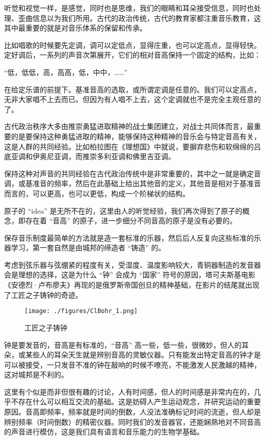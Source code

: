 听觉和视觉一样，是感觉，同时也是思维，我们的眼睛和耳朵接受信息，同时也处理、歪曲信息以为我们所用。古代的政治传统，古代的教育家都注重音乐教育，这其中最重要的就是对音乐体系的保留和传承。

比如唱歌的时候要先定调，调可以定低点，显得庄重，也可以定高点，显得轻快。定好调后，一系列的声音次第展开，它们的相对音高保持一个固定的结构，比如：

“低，低低，高，高高，低，中中，……”

在给定乐谱的前提下。基准音高的选取，或所谓定调是任意的。我们可以定高点，无非大家唱不上去而已。但因为有人唱不上去，这个定调就也不是完全主观任意的了。

古代政治秩序大多由推崇勇猛进取精神的战士集团建立，对战士共同体而言，最重要的是要保持这种勇猛进取的精神，能够保持这种精神的音乐会与特定音高有关，这是人群的共同经验。比如柏拉图在《理想国》中就说，要摒弃悲伤和软绵绵的吕底亚调和伊奥尼亚调，而推崇多利亚调和佛里吉亚调。

保持这种对声音的共同经验在古代政治传统中是非常重要的，其中之一就是确定音调，或基准音的频率，然后在此基础上给出其他音的定义，其他音是相对于基准音而言的，可以更高，也可以更低，构成一个阶梯状的结构。

原子的 “idea” 是无所不在的，这里由人的听觉经验，我们再次得到了原子的概念，即存在着 “音高” 的原子，进一步细分不同音高的原子是没有必要的。

保存音乐制度最简单的方法就是造一套标准的乐器，然后后人反复向这些标准的乐器学习，第一套自然是由城邦的缔造者 “铸造” 的。

考虑到弦乐器与弦绷紧的程度有关，受湿度、温度影响较大，青铜器制造的发音器会是理想的选择，这是为什么 “钟” 会成为 “国家” 符号的原因，塔可夫斯基电影《安德烈·卢布廖夫》再现的是俄罗斯帝国创旦的精神基础，在影片的结尾就出现了工匠之子铸钟的奇迹。

\begin{figure}[ht]
\centering
\texttt{[image: ./figures/ClBohr\_1.png]}
\caption{工匠之子铸钟} \label{ClBohr_fig1}
\end{figure}


钟是要发音的，音高是有标准的，“音高” 高一些，低一些，很微妙，但人的耳朵，或某些人的耳朵天生就是辨别音高的灵敏仪器。只有能发出特定音高的钟才是可以被接受，一只发音不准的钟在敲响的时候不嘹亮，不能激发人民激越的精神，这对城邦是不利的。

这里有个似是而非但很有趣的讨论，人有时间感，但人的时间感是非常内在的，几乎不存在什么可以相互交流的基础。这是妨碍人产生运动观念，并研究运动的重要原因。音高即频率，频率就是时间的倒数，人没法准确标记时间的流逝，但人却是辨别频率（时间倒数）的精密仪器。同时我们的发音器官，还能娴熟地对不同音高的声音进行模仿，这是我们具有语言和音乐能力的生物学基础。

